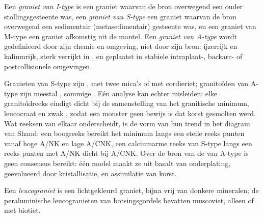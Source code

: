 \begin{definition}[Graniettypologie]\label{def:b2:crustal-melting:types}
Een \emph{graniet van I-type} is een graniet waarvan de bron overwegend een
ouder stollingsgesteente was, een \emph{graniet van S-type} een graniet waarvan de bron
overwegend een sedimentair (metasedimentair) gesteente was, en een graniet van M-type een graniet afkomstig uit
de mantel. Een \emph{graniet van A-type} wordt gedefinieerd door zijn chemie en
omgeving, niet door zijn bron: ijzerrijk en kaliumrijk, sterk verrijkt in , en geplaatst in stabiele intraplaat-, backarc- of postcollisionele omgevingen.
\end{definition}

Granieten van S-type zijn , met twee mica's of met cordieriet; granitoïden van A-type
zijn meestal , sommige . Eén analyse kan echter misleiden: elke
granitoïdreeks eindigt dicht bij de samenstelling van het granitische minimum, leucocraat en zwak
, zodat een  monster geen bewijs is dat korst gesmolten werd. Wat
reeksen van elkaar onderscheidt, is de vorm van hun trend in het diagram van Shand: een boogreeks bereikt het
minimum langs een steile reeks punten vanaf hoge A/NK en lage A/CNK, een calciumarme reeks van S-type
langs een reeks punten met A/NK dicht bij A/CNK. Over de bron van de  van A-type
is geen consensus bereikt: één model maakt ze uit basalt van onderplating, geëvolueerd door kristallisatie,
 en assimilatie van korst.

\begin{definition}[Leucograniet]\label{def:b2:crustal-melting:leucogranite}
Een \emph{leucograniet} is een lichtgekleurd graniet, bijna vrij van
donkere mineralen; de peraluminische leucogranieten van botsingsgordels bevatten muscoviet, alleen of
met biotiet.
\end{definition}

